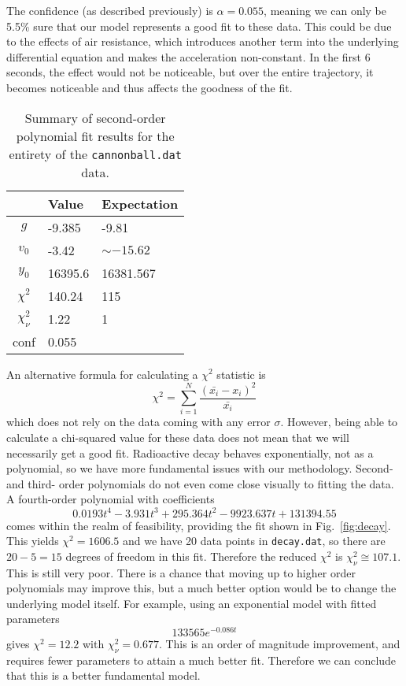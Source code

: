 \documentclass{article}
\begin{document}
The confidence (as described previously) is $\alpha=0.055$, meaning we can only be 5.5\% sure that our model represents a good fit to these data. This could be due to the effects of air resistance, which introduces another term into the underlying differential equation and makes the acceleration non-constant. In the first 6 seconds, the effect would not be noticeable, but over the entire trajectory, it becomes noticeable and thus affects the goodness of the fit.

\begin{table}[H]
    \centering
    \begin{tabular}{c|l|l}
         & Value & Expectation \\
        \hline
        $g$ & -9.385 & -9.81 \\
        $v_0$ & -3.42 & $\sim-15.62$ \\
        $y_0$ & 16395.6 & 16381.567 \\
        $\chi^2$ & 140.24 & 115 \\
        $\chi_\nu^2$ & 1.22 & 1 \\
        conf & 0.055 &
    \end{tabular}
    \caption{Summary of second-order polynomial fit results for the entirety of the \texttt{cannonball.dat} data.}
    \label{tab:fit1}
\end{table}

\bigskip
{}
\medskip

An alternative formula for calculating a $\chi^2$ statistic is \begin{equation*}
    \chi^2 = \sum_{i=1}^N \frac{(\bar{x_i}-x_i)^2}{\bar{x_i}}
\end{equation*}
which does not rely on the data coming with any error $\sigma$. However, being able to calculate a chi-squared value for these data does not mean that we will necessarily get a good fit. Radioactive decay behaves exponentially, not as a polynomial, so we have more fundamental issues with our methodology. Second- and third- order polynomials do not even come close visually to fitting the data. A fourth-order polynomial with coefficients \begin{equation*}
    0.0193t^4 - 3.931t^3 + 295.364t^2 - 9923.637t + 131394.55
\end{equation*}
comes within the realm of feasibility, providing the fit shown in Fig.~\ref{fig:decay}. This yields $\chi^2=1606.5$ and we have 20 data points in \texttt{decay.dat}, so there are $20-5=15$ degrees of freedom in this fit. Therefore the reduced $\chi^2$ is $\chi_\nu^2 \cong 107.1$. This is still very poor. There is a chance that moving up to higher order polynomials may improve this, but a much better option would be to change the underlying model itself. For example, using an exponential model with fitted parameters \begin{equation*}
    133565e^{-0.086t}
\end{equation*}
gives $\chi^2=12.2$ with $\chi_\nu^2 = 0.677$. This is an order of magnitude improvement, and requires fewer parameters to attain a much better fit. Therefore we can conclude that this is a better fundamental model. 
\end{document}
